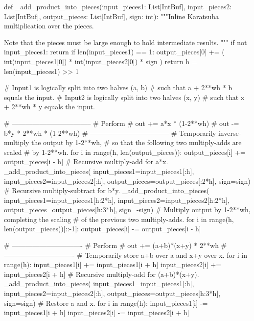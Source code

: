 \documentclass[onecolumn,unpublished]{quantumarticle}
\begin{document}
\begin{python}
def _add_product_into_pieces(input_pieces1: List[IntBuf],
                             input_pieces2: List[IntBuf],
                             output_pieces: List[IntBuf],
                             sign: int):
    """Inline Karatsuba multiplication over the pieces.

    Note that the pieces must be large enough to hold
    intermediate results.
    """
    if not input_pieces1:
        return
    if len(input_pieces1) == 1:
        output_pieces[0] += (
            int(input_pieces1[0]) *
            int(input_pieces2[0]) *
            sign
        )
        return
    h = len(input_pieces1) >> 1

    # Input1 is logically split into two halves (a, b)
    #   such that a + 2**wh * b equals the input.
    # Input2 is logically split into two halves (x, y)
    #   such that x + 2**wh * y equals the input.

    # -----------------------------------
    # Perform
    #     out += a*x * (1-2**wh)
    #     out -= b*y * 2**wh * (1-2**wh)
    # -----------------------------------
    # Temporarily inverse-multiply the output by 1-2**wh,
    # so that the following two multiply-adds are scaled
    # by 1-2**wh.
    for i in range(h, len(output_pieces)):
        output_pieces[i] += output_pieces[i - h]
    # Recursive multiply-add for a*x.
    _add_product_into_pieces(
        input_pieces1=input_pieces1[:h],
        input_pieces2=input_pieces2[:h],
        output_pieces=output_pieces[:2*h],
        sign=sign)
    # Recursive multiply-subtract for b*y.
    _add_product_into_pieces(
        input_pieces1=input_pieces1[h:2*h],
        input_pieces2=input_pieces2[h:2*h],
        output_pieces=output_pieces[h:3*h],
        sign=-sign)
    # Multiply output by 1-2**wh, completing the scaling
    # of the previous two multiply-adds.
    for i in range(h, len(output_pieces))[::-1]:
        output_pieces[i] -= output_pieces[i - h]

    # -------------------------------
    # Perform
    #     out += (a+b)*(x+y) * 2**wh
    # -------------------------------
    # Temporarily store a+b over a and x+y over x.
    for i in range(h):
        input_pieces1[i] += input_pieces1[i + h]
        input_pieces2[i] += input_pieces2[i + h]
    # Recursive multiply-add for (a+b)*(x+y).
    _add_product_into_pieces(
        input_pieces1=input_pieces1[:h],
        input_pieces2=input_pieces2[:h],
        output_pieces=output_pieces[h:3*h],
        sign=sign)
    # Restore a and x.
    for i in range(h):
        input_pieces1[i] -= input_pieces1[i + h]
        input_pieces2[i] -= input_pieces2[i + h]
\end{python}
\end{document}
